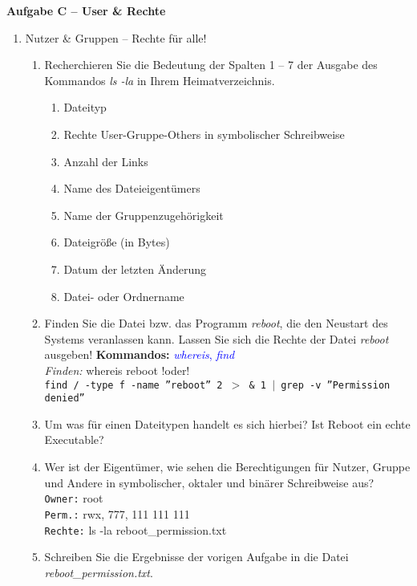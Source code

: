 \documentclass[paper=a4,fontsize=11pt]{scrartcl}%
\numberwithin{equation}{section}
\begin{document}
\begin{center}\Large{\textbf{Aufgabe C -- User \& Rechte}}\end{center}\vskip0.25in
\begin{enumerate}

\item Nutzer \& Gruppen -- Rechte für alle!
	\begin{enumerate}
        \item Recherchieren Sie die Bedeutung der Spalten 1 -- 7 der Ausgabe des Kommandos \emph{ls -la} in Ihrem Heimatverzeichnis.
         \begin{enumerate}
        		\item Dateityp
        		\item Rechte User-Gruppe-Others in symbolischer Schreibweise
        		\item Anzahl der Links
        		\item Name des Dateieigentümers
        		\item Name der Gruppenzugehörigkeit
        		\item Dateigröße (in Bytes)
        		\item Datum der letzten Änderung
        		\item Datei- oder Ordnername
        \end{enumerate}
        \item Finden Sie die Datei bzw. das Programm \textit{reboot}, die den Neustart des Systems veranlassen kann. Lassen Sie sich die Rechte der Datei \textit{reboot} ausgeben!
        \textbf{Kommandos:} \textcolor{blue}{\emph{whereis}, \emph{find}}\\
        \textit{Finden:} whereis reboot !oder!\\
        \texttt{find / -type f -name ''reboot'' 2 $>$ \& 1 $|$ grep -v ''Permission denied''} 
        \item Um was für einen Dateitypen handelt es sich hierbei? Ist Reboot ein echte Executable?
        \item Wer ist der Eigentümer, wie sehen die Berechtigungen für Nutzer, Gruppe und Andere in symbolischer, oktaler und binärer Schreibweise aus?\\
        \texttt{Owner:} root\\
        \texttt{Perm.:} rwx, 777, 111 111 111\\
        \texttt{Rechte:} ls -la reboot\-\_permission.txt
        \item Schreiben Sie die Ergebnisse der vorigen Aufgabe in die Datei \textit{reboot\-\_permission.txt}.
   

\end{enumerate}
\end{enumerate}
\end{document}
